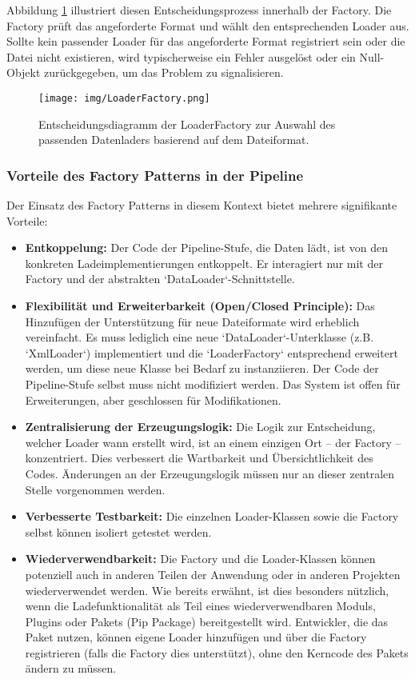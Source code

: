 \documentclass[a4paper]{article} %
\begin{document}
Abbildung \ref{fig:loaderFactory} illustriert diesen Entscheidungsprozess innerhalb der Factory. Die Factory prüft das angeforderte Format und wählt den entsprechenden Loader aus. Sollte kein passender Loader für das angeforderte Format registriert sein oder die Datei nicht existieren, wird typischerweise ein Fehler ausgelöst oder ein Null-Objekt zurückgegeben, um das Problem zu signalisieren.

\begin{figure}[htbp] %
    \centering %
    \texttt{[image: img/LoaderFactory.png]} %
    \caption{Entscheidungsdiagramm der LoaderFactory zur Auswahl des passenden Datenladers basierend auf dem Dateiformat.} %
    \label{fig:loaderFactory} %
\end{figure}

\subsubsection{Vorteile des Factory Patterns in der Pipeline}
Der Einsatz des Factory Patterns in diesem Kontext bietet mehrere signifikante Vorteile:

\begin{itemize}
    \item \textbf{Entkoppelung:} Der Code der Pipeline-Stufe, die Daten lädt, ist von den konkreten Ladeimplementierungen entkoppelt. Er interagiert nur mit der Factory und der abstrakten `DataLoader`-Schnittstelle.
    \item \textbf{Flexibilität und Erweiterbarkeit (Open/Closed Principle):} Das Hinzufügen der Unterstützung für neue Dateiformate wird erheblich vereinfacht. Es muss lediglich eine neue `DataLoader`-Unterklasse (z.B. `XmlLoader`) implementiert und die `LoaderFactory` entsprechend erweitert werden, um diese neue Klasse bei Bedarf zu instanziieren. Der Code der Pipeline-Stufe selbst muss nicht modifiziert werden. Das System ist offen für Erweiterungen, aber geschlossen für Modifikationen.
    \item \textbf{Zentralisierung der Erzeugungslogik:} Die Logik zur Entscheidung, welcher Loader wann erstellt wird, ist an einem einzigen Ort – der Factory – konzentriert. Dies verbessert die Wartbarkeit und Übersichtlichkeit des Codes. Änderungen an der Erzeugungslogik müssen nur an dieser zentralen Stelle vorgenommen werden.
    \item \textbf{Verbesserte Testbarkeit:} Die einzelnen Loader-Klassen sowie die Factory selbst können isoliert getestet werden.
    \item \textbf{Wiederverwendbarkeit:} Die Factory und die Loader-Klassen können potenziell auch in anderen Teilen der Anwendung oder in anderen Projekten wiederverwendet werden. Wie bereits erwähnt, ist dies besonders nützlich, wenn die Ladefunktionalität als Teil eines wiederverwendbaren Moduls, Plugins oder Pakets (Pip Package) bereitgestellt wird. Entwickler, die das Paket nutzen, können eigene Loader hinzufügen und über die Factory registrieren (falls die Factory dies unterstützt), ohne den Kerncode des Pakets ändern zu müssen.
\end{itemize}
\end{document}
